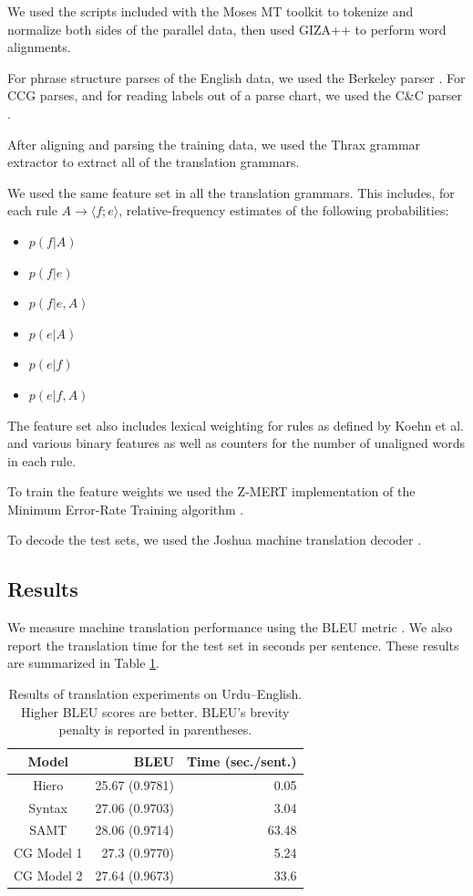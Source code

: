\documentclass{article}
\begin{document}
We used the scripts included with the Moses MT toolkit \cite{moses} to tokenize and normalize both sides of the parallel data, then used GIZA++ \cite{giza} to perform word alignments.

For phrase structure parses of the English data, we used the Berkeley parser \cite{berkeley}. For CCG parses, and for reading labels out of a parse chart, we used the C\&C parser \cite{candc}.

After aligning and parsing the training data, we used the Thrax grammar extractor \cite{joshua3} to extract all of the translation grammars.

We used the same feature set in all the translation grammars. This includes, for each rule $A \to \langle f ; e \rangle$, relative-frequency estimates of the following probabilities:
\begin{itemize}
\item $p(f|A)$
\item $p(f|e)$
\item $p(f|e,A)$
\item $p(e|A)$
\item $p(e|f)$
\item $p(e|f,A)$
\end{itemize}
The feature set also includes lexical weighting for rules as defined by Koehn et al.  and various binary features as well as counters for the number of unaligned words in each rule.

To train the feature weights we used the Z-MERT implementation \cite{zmert} of the Minimum Error-Rate Training algorithm \cite{mert}.

To decode the test sets, we used the Joshua machine translation decoder \cite{joshua3}.

\subsection{Results}

We measure machine translation performance using the BLEU metric \cite{papineni-bleu}. We also report the translation time for the test set in seconds per sentence. These results are summarized in Table \ref{table:results}.

\begin{table}
\centering
\begin{tabular}{|c|r|r|}
\hline
Model & BLEU & Time (sec./sent.) \\
\hline
Hiero & 25.67 (0.9781) & 0.05 \\
Syntax & 27.06 (0.9703) & 3.04 \\
SAMT & 28.06 (0.9714) & 63.48 \\
CG Model 1 & 27.3 (0.9770) & 5.24 \\
CG Model 2 & 27.64 (0.9673) & 33.6 \\
\hline
\end{tabular}
\caption{Results of translation experiments on Urdu--English. Higher BLEU scores are better. BLEU's brevity penalty is reported in parentheses.\label{table:results}}
\end{table}
\end{document}
